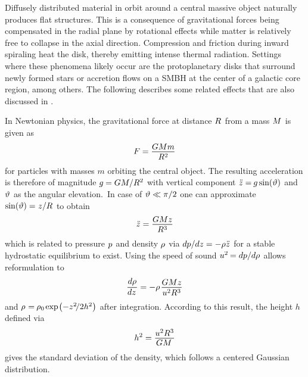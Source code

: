 Diffusely distributed material in orbit around a central massive object naturally produces flat structures. This is a
consequence of gravitational forces being compensated in the radial plane by rotational effects while matter is relatively
free to collapse in the axial direction. Compression and friction during inward spiraling heat the disk, thereby emitting
intense thermal radiation. Settings where these phenomena likely occur are the protoplanetary disks that surround newly formed
stars or accretion flows on a SMBH at the center of a galactic core region, among others. The following describes some related effects
that are also discussed in \cite{Longair_2011}.

In Newtonian physics, the gravitational force at distance $R \kern+0.5pt$ from a mass $M \kern+0.5pt$ is given as
\begin{equation}
	F = \frac{\raisebox{-0.3ex}{$GMm$}}{R^2}
	\label{eqn:newton}
\end{equation}
for particles with masses $m$ orbiting the central object. The resulting acceleration is therefore of magnitude
$g \kern-0.3pt = GM / \smash{R^2}$ with vertical component $\ddot{z} = \kern-0.6pt g \sin(\vartheta)$ and
$\vartheta \kern+0.5pt$ as the angular elevation.~In case of $\kern+0.5pt \vartheta \ll \pi / 2$ one can approximate
$\sin(\vartheta) = \kern+0.3pt z / \kern-0.2pt R \kern+0.5pt$ to obtain
\begin{equation*}
	\ddot{z} = \frac{\raisebox{-0.3ex}{$GMz$}}{R^3}
\end{equation*}
which is related to pressure $p \kern+0.5pt$ and density $\kern-0.5pt \rho \kern+0.5pt$ via
$d \kern-0.1pt p / \kern-0.1pt dz = -\rho \ddot{z} \kern+0.5pt$ for a stable hydrostatic equilibrium to exist. Using the speed
of sound $\smash{u^2} \kern-0.7pt = d \kern-0.1pt p / \kern-0.1pt d \kern-0.1pt \rho \kern+0.5pt$ allows reformulation to
\begin{equation}
	\frac{d \kern-0.1pt \rho}{\raisebox{0.2ex}{$dz \kern+1.0pt$}} =
	-\rho \kern+1.0pt \frac{\raisebox{-0.3ex}{$GMz$}}{u^2R^3}
	\label{eqn:density}
\end{equation}
and $\rho \kern+0.6pt = \kern-0.6pt \rho_0 \kern-0.5pt \exp \kern-1.0pt \smash{\bigl( -z^2 \kern-1.8pt / 2 h^2 \bigr)}$
after integration. According to this result, the height $h$ defined via
\begin{equation}
	h^2 = \frac{\raisebox{-0.3ex}{$u^2R^3$}}{\raisebox{0.2ex}{$GM \kern+1.5pt$}}
	\label{eqn:height}
\end{equation}
gives the standard deviation of the density, which follows a centered Gaussian distribution.

